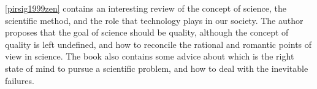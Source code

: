 \ref{pirsig1999zen} contains an interesting review of the concept of science, the scientific method, and the role that technology plays in our society. The author proposes that the goal of science should be quality, although the concept of quality is left undefined, and how to reconcile the rational and romantic points of view in science. The book also contains some advice about which is the right state of mind to pursue a scientific problem, and how to deal with the inevitable failures.



